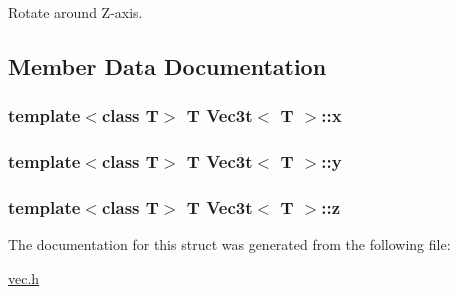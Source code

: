 Rotate around Z-\/axis. 



\subsection{Member Data Documentation}
\subsubsection[{\texorpdfstring{x}{x}}]{\setlength{\rightskip}{0pt plus 5cm}template$<$class T$>$ T {\bf Vec3t}$<$ T $>$\+::x}\hypertarget{structVec3t_a71e5e9a4307fb9973fbbb189cdab6ece}{}\label{structVec3t_a71e5e9a4307fb9973fbbb189cdab6ece}
\subsubsection[{\texorpdfstring{y}{y}}]{\setlength{\rightskip}{0pt plus 5cm}template$<$class T$>$ T {\bf Vec3t}$<$ T $>$\+::y}\hypertarget{structVec3t_a0dbe50be96dabd1d09c0866e1df61470}{}\label{structVec3t_a0dbe50be96dabd1d09c0866e1df61470}
\subsubsection[{\texorpdfstring{z}{z}}]{\setlength{\rightskip}{0pt plus 5cm}template$<$class T$>$ T {\bf Vec3t}$<$ T $>$\+::z}\hypertarget{structVec3t_a9337e7d087c3a26e833de8c6fefca59b}{}\label{structVec3t_a9337e7d087c3a26e833de8c6fefca59b}


The documentation for this struct was generated from the following file\+:\begin{DoxyCompactItemize}
\item 
\hyperlink{vec_8h}{vec.\+h}\end{DoxyCompactItemize}
